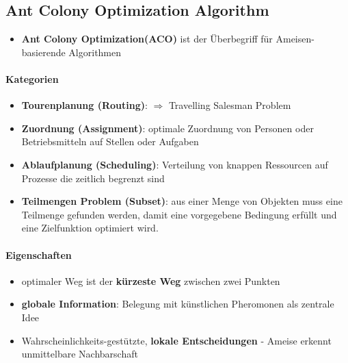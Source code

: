 \subsection{Ant Colony Optimization Algorithm}
\begin{itemize}
	\item \textbf{Ant Colony Optimization(ACO)} ist der Überbegriff für Ameisen-basierende Algorithmen
\end{itemize}
\paragraph{Kategorien}
\begin{itemize}
	\item \textbf{Tourenplanung (Routing)}: $\Rightarrow$ Travelling Salesman Problem
	\item \textbf{Zuordnung (Assignment)}: optimale Zuordnung von Personen oder Betriebsmitteln auf Stellen oder Aufgaben
	\item \textbf{Ablaufplanung (Scheduling)}: Verteilung von knappen Ressourcen auf Prozesse die zeitlich begrenzt sind
	\item \textbf{Teilmengen Problem (Subset)}: aus einer Menge von Objekten muss eine Teilmenge gefunden werden, damit eine vorgegebene Bedingung erfüllt und eine Zielfunktion optimiert wird. 
\end{itemize}
\paragraph{Eigenschaften}
\begin{itemize}
	\item optimaler Weg ist der \textbf{kürzeste Weg} zwischen zwei Punkten
	\item \textbf{globale Information}: Belegung mit künstlichen Pheromonen als zentrale Idee
	\item Wahrscheinlichkeits-gestützte, \textbf{lokale Entscheidungen} - Ameise erkennt unmittelbare Nachbarschaft
\end{itemize}
